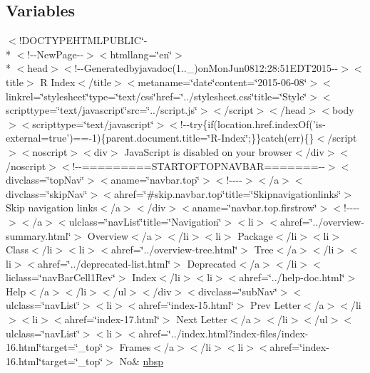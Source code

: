 \subsection*{Variables}
\begin{DoxyCompactItemize}
\item 
$<$!D\-O\-C\-T\-Y\-P\-E\-H\-T\-M\-L\-P\-U\-B\-L\-I\-C\char`\"{}-\/\\*
$<$!-\/-\/New\-Page-\/-\/$>$$<$htmllang=\char`\"{}en\char`\"{}$>$\\*
$<$head$>$$<$!-\/-\/Generatedbyjavadoc(1..\-\_)on\-Mon\-Jun0812\-:28\-:51\-E\-D\-T2015-\/-\/$>$$<$title$>$ R Index$<$/title$>$$<$metaname=\char`\"{}date\char`\"{}content=\char`\"{}2015-\/06-\/08\char`\"{}$>$$<$linkrel=\char`\"{}stylesheet\char`\"{}type=\char`\"{}text/css\char`\"{}href=\char`\"{}../stylesheet.\-css\char`\"{}title=\char`\"{}\-Style\char`\"{}$>$$<$scripttype=\char`\"{}text/javascript\char`\"{}src=\char`\"{}../script.\-js\char`\"{}$>$$<$/script$>$$<$/head$>$$<$body$>$$<$scripttype=\char`\"{}text/javascript\char`\"{}$>$$<$!-\/-\/try\{if(location.\-href.\-index\-Of('is-\/external=true')==-\/1)\{parent.\-document.\-title=\char`\"{}\-R-\/\-Index\char`\"{};\}\}catch(err)\{\}$<$/script$>$$<$noscript$>$$<$div$>$ Java\-Script is disabled on your browser$<$/div$>$$<$/noscript$>$$<$!-\/-\/=========\-S\-T\-A\-R\-T\-O\-F\-T\-O\-P\-N\-A\-V\-B\-A\-R=======-\/-\/$>$$<$divclass=\char`\"{}top\-Nav\char`\"{}$>$$<$aname=\char`\"{}navbar.\-top\char`\"{}$>$$<$!-\/-\/-\/-\/$>$$<$/a$>$$<$divclass=\char`\"{}skip\-Nav\char`\"{}$>$$<$ahref=\char`\"{}\#skip.\-navbar.\-top\char`\"{}title=\char`\"{}\-Skipnavigationlinks\char`\"{}$>$ Skip navigation links$<$/a$>$$<$/div$>$$<$aname=\char`\"{}navbar.\-top.\-firstrow\char`\"{}$>$$<$!-\/-\/-\/-\/$>$$<$/a$>$$<$ulclass=\char`\"{}nav\-List\char`\"{}title=\char`\"{}\-Navigation\char`\"{}$>$$<$li$>$$<$ahref=\char`\"{}../overview-\/summary.\-html\char`\"{}$>$ Overview$<$/a$>$$<$/li$>$$<$li$>$ Package$<$/li$>$$<$li$>$ Class$<$/li$>$$<$li$>$$<$ahref=\char`\"{}../overview-\/tree.\-html\char`\"{}$>$ Tree$<$/a$>$$<$/li$>$$<$li$>$$<$ahref=\char`\"{}../deprecated-\/list.\-html\char`\"{}$>$ Deprecated$<$/a$>$$<$/li$>$$<$liclass=\char`\"{}nav\-Bar\-Cell1\-Rev\char`\"{}$>$ Index$<$/li$>$$<$li$>$$<$ahref=\char`\"{}../help-\/doc.\-html\char`\"{}$>$ Help$<$/a$>$$<$/li$>$$<$/ul$>$$<$/div$>$$<$divclass=\char`\"{}sub\-Nav\char`\"{}$>$$<$ulclass=\char`\"{}nav\-List\char`\"{}$>$$<$li$>$$<$ahref=\char`\"{}index-\/15.\-html\char`\"{}$>$ Prev Letter$<$/a$>$$<$/li$>$$<$li$>$$<$ahref=\char`\"{}index-\/17.\-html\char`\"{}$>$ Next Letter$<$/a$>$$<$/li$>$$<$/ul$>$$<$ulclass=\char`\"{}nav\-List\char`\"{}$>$$<$li$>$$<$ahref=\char`\"{}../index.\-html?index-\/files/index-\/16.\-html\char`\"{}target=\char`\"{}\-\_\-top\char`\"{}$>$ Frames$<$/a$>$$<$/li$>$$<$li$>$$<$ahref=\char`\"{}index-\/16.\-html\char`\"{}target=\char`\"{}\-\_\-top\char`\"{}$>$ No\& \hyperlink{index-16_8html_a479d00f21dbca369efe3be97f1ef785a}{nbsp}
\end{DoxyCompactItemize}


